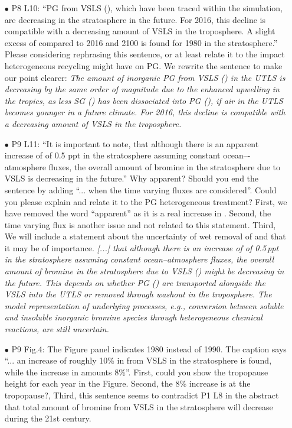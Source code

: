 \begin{itemize}
\begin{itemize}
\begin{itemize}
   \item[$\bullet$]{\color{blue}P8 L10: ``PG from VSLS (), which have been traced within the simulation, are decreasing in the stratosphere in the future. For 2016, this decline is compatible with a decreasing amount of VSLS in the troposphere. A slight excess of  compared to 2016 and 2100 is found for 1980 in the stratosphere.'' Please considering rephrasing this sentence, or at least relate it to the impact heterogeneous recycling might have on PG.}
     We rewrite the sentence to make our point clearer: \emph{The amount of inorganic PG from VSLS () in the UTLS is decreasing by the same order of magnitude due to the enhanced upwelling in the tropics, as less SG () has been dissociated into PG (), if air in the UTLS becomes younger in a future climate. For 2016, this decline is compatible with a decreasing amount of VSLS in the troposphere.}
   \item[$\bullet$]{\color{blue}P9 L11: ``It is important to note, that although there is an apparent increase of  of 0.5 ppt in the stratosphere assuming constant ocean–-atmosphere fluxes, the overall amount of bromine in the stratosphere due to VSLS is decreasing in the future.'' Why apparent? Should you end the sentence by adding ``... when the time varying fluxes are considered''. Could you please explain and relate it to the  PG heterogeneous treatment?}
     First, we have removed the word ``apparent'' as it is a real increase in . Second, the time varying flux is another issue and not related to this statement. Third, We will include a statement about the uncertainty of wet removal of  and that it may be of importance. \emph{[...] that although there is an increase of  of 0.5\,\unit{ppt} in the stratosphere assuming constant ocean--atmosphere fluxes, the overall amount of bromine in the stratosphere due to VSLS () might be decreasing in the future. This depends on whether PG () are transported alongside the VSLS into the UTLS or removed through washout in the troposphere. The model representation of underlying processes, e.g., conversion between soluble and insoluble inorganic bromine species through heterogeneous chemical reactions, are still uncertain.}
   \item[$\bullet$]{\color{blue}P9 Fig.4: The Figure panel indicates 1980 instead of 1990. The caption says ``... an increase of roughly 10\% in  from VSLS in the stratosphere is found, while the increase in  amounts 8\%''. First, could you show the tropopause height for each year in the Figure. Second, the 8\%  increase is at the tropopause?, Third, this sentence seems to contradict P1 L8 in the abstract that total amount of bromine from VSLS in the stratosphere will decrease during the 21st century.}

\end{itemize}
\end{itemize}
\end{itemize}
